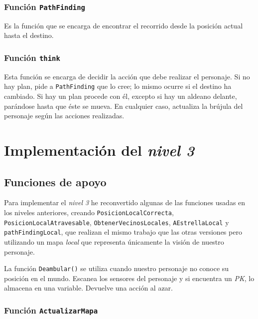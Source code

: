 \documentclass[11pt,a4paper]{article}
\begin{document}
\subsubsection*{Función \texttt{PathFinding} }%
\label{sub:funcion_pathfinding_}

Es la función que se encarga de encontrar el recorrido desde la posición actual hasta el destino.



\subsubsection*{Función \texttt{think}}%
\label{sub:funcion_think}

Esta función se encarga de decidir la acción que debe realizar el personaje. Si no hay plan, pide a \texttt{PathFinding} que lo cree; lo mismo ocurre si el destino ha cambiado. Si hay un plan procede con él, excepto si hay un aldeano delante, parándose hasta que éste se mueva. En cualquier caso, actualiza la brújula del personaje según las acciones realizadas.



\section{Implementación del \textit{nivel 3}}

\subsection*{Funciones de apoyo}

Para implementar el \textit{nivel 3} he reconvertido algunas de las funciones usadas en los niveles anteriores, creando \texttt{PosicionLocalCorrecta}, \texttt{PosicionLocalAtravesable}, \texttt{ObtenerVecinosLocales}, \texttt{AEstrellaLocal} y \texttt{pathFindingLocal}, que realizan el mismo trabajo que las otras versiones pero utilizando un mapa \textit{local} que representa únicamente la visión de nuestro personaje.

La función \texttt{Deambular()} se utiliza cuando nuestro personaje no conoce su posición en el mundo. Escanea los sensores del personaje y si encuentra un \textit{PK}, lo almacena en una variable. Devuelve una acción al azar.

\subsubsection*{Función \texttt{ActualizarMapa}}
\end{document}
